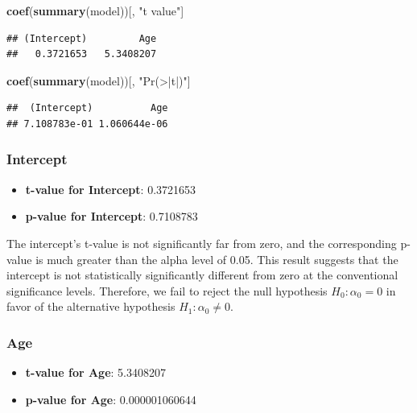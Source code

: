 \documentclass[
]{article}
\newenvironment{Shaded}{\begin{snugshade}}{\end{snugshade}}
\newcommand{\FunctionTok}[1]{\textcolor[rgb]{0.13,0.29,0.53}{\textbf{#1}}}
\newcommand{\NormalTok}[1]{#1}
\newcommand{\StringTok}[1]{\textcolor[rgb]{0.31,0.60,0.02}{#1}}
\providecommand{\tightlist}{%
  \setlength{\itemsep}{0pt}\setlength{\parskip}{0pt}}
\begin{document}
\begin{Shaded}
\begin{Highlighting}[]
\FunctionTok{coef}\NormalTok{(}\FunctionTok{summary}\NormalTok{(model))[, }\StringTok{"t value"}\NormalTok{]}
\end{Highlighting}
\end{Shaded}

\begin{verbatim}
## (Intercept)         Age 
##   0.3721653   5.3408207
\end{verbatim}

\begin{Shaded}
\begin{Highlighting}[]
\FunctionTok{coef}\NormalTok{(}\FunctionTok{summary}\NormalTok{(model))[, }\StringTok{"Pr(\textgreater{}|t|)"}\NormalTok{]}
\end{Highlighting}
\end{Shaded}

\begin{verbatim}
##  (Intercept)          Age 
## 7.108783e-01 1.060644e-06
\end{verbatim}

\subsubsection{Intercept}\label{intercept-1}

\begin{itemize}
\tightlist
\item
  \textbf{t-value for Intercept}: 0.3721653
\item
  \textbf{p-value for Intercept}: 0.7108783
\end{itemize}

The intercept's t-value is not significantly far from zero, and the
corresponding p-value is much greater than the alpha level of 0.05. This
result suggests that the intercept is not statistically significantly
different from zero at the conventional significance levels. Therefore,
we fail to reject the null hypothesis \(H_0: \alpha_{0} = 0\) in favor
of the alternative hypothesis \(H_1: \alpha_{0} \neq 0\).

\subsubsection{Age}\label{age}

\begin{itemize}
\tightlist
\item
  \textbf{t-value for Age}: 5.3408207
\item
  \textbf{p-value for Age}: 0.000001060644
\end{itemize}
\end{document}
